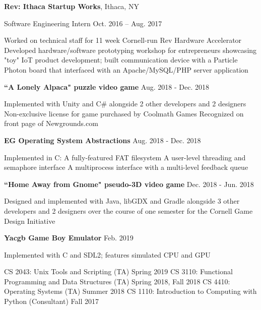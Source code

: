 \documentclass[letterpaper,MMMyyyy,nonstopmode]{simpleresumecv}
\begin{document}
\begin{Body}
\Gap

\Entry
\textbf{Rev: Ithaca Startup Works},
Ithaca, NY

\Gap
\BulletItem
Software Engineering Intern
\hfill
Oct. 2016 -- Aug. 2017
\begin{Detail}
\SubBulletItem
Worked on technical staff for 11 week Cornell-run Rev Hardware Accelerator
\SubBulletItem
Developed hardware/software prototyping workshop for entrepreneurs showcasing \newline "toy" IoT product development; built communication device with a Particle Photon \newline board that interfaced with an Apache/MySQL/PHP server application
\end{Detail}

\BulletItem
\textbf{``A Lonely Alpaca" puzzle video game}
\hfill
Aug. 2018 - Dec. 2018
\begin{Detail}
\Item
Implemented with Unity and C\# alongside 2 other developers and 2 designers
\SubBulletItem Non-exclusive license for game purchased by Coolmath Games 
\SubBulletItem Recognized on front page of Newgrounds.com
\end{Detail}


\Gap
\BulletItem
\textbf{EG Operating System Abstractions}
\hfill
Aug. 2018 - Dec. 2018
\begin{Detail}
\Item
Implemented in C:
\SubBulletItem A fully-featured FAT filesystem
\SubBulletItem A user-level threading and semaphore interface
\SubBulletItem A multiprocess interface with a multi-level feedback queue
\end{Detail}

\Gap

\BulletItem
\textbf{``Home Away from Gnome" pseudo-3D video game}
\hfill
Dec. 2018 - Jun. 2018
\begin{Detail}
\Item
Designed and implemented with Java, libGDX and Gradle alongside 3 other developers \newline and 2 designers over the course of one semester for the Cornell Game Design Initiative
\end{Detail}

\Gap
\BulletItem
\textbf{Yacgb Game Boy Emulator}
\hfill
Feb. 2019
\begin{Detail}
\Item
Implemented with C and SDL2; features simulated CPU and GPU
\end{Detail}


\BulletItem CS 2043: Unix Tools and Scripting (TA) \hfill Spring 2019
\BulletItem CS 3110: Functional Programming and Data Structures (TA) \hfill Spring 2018, Fall 2018
\BulletItem CS 4410: Operating Systems (TA) \hfill Summer 2018
\BulletItem CS 1110: Introduction to Computing with Python (Consultant) \hfill Fall 2017


\end{Body}
\end{document}
